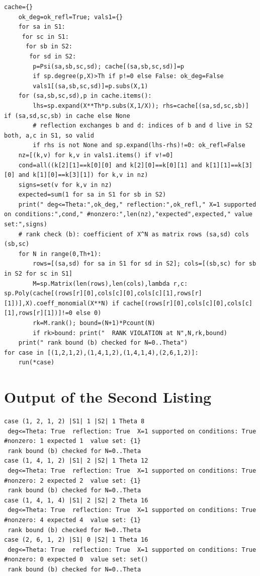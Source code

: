 \documentclass[11pt,letterpaper]{report}
\theoremstyle{plain}
\theoremstyle{definition}
\theoremstyle{remark}
\begin{document}
\begin{Verbatim}[fontsize=\scriptsize,breaklines=true,breakanywhere=true,frame=single]
    cache={}
    ok_deg=ok_refl=True; vals1={}
    for sa in S1:
     for sc in S1:
      for sb in S2:
       for sd in S2:
        p=Psi(sa,sb,sc,sd); cache[(sa,sb,sc,sd)]=p
        if sp.degree(p,X)>Th if p!=0 else False: ok_deg=False
        vals1[(sa,sb,sc,sd)]=p.subs(X,1)
    for (sa,sb,sc,sd),p in cache.items():
        lhs=sp.expand(X**Th*p.subs(X,1/X)); rhs=cache[(sa,sd,sc,sb)] if (sa,sd,sc,sb) in cache else None
        # reflection exchanges b and d: indices of b and d live in S2 both, a,c in S1, so valid
        if rhs is not None and sp.expand(lhs-rhs)!=0: ok_refl=False
    nz=[(k,v) for k,v in vals1.items() if v!=0]
    cond=all((k[2][1]==k[0][0] and k[2][0]==k[0][1] and k[1][1]==k[3][0] and k[1][0]==k[3][1]) for k,v in nz)
    signs=set(v for k,v in nz)
    expected=sum(1 for sa in S1 for sb in S2)
    print(" deg<=Theta:",ok_deg," reflection:",ok_refl," X=1 supported on conditions:",cond," #nonzero:",len(nz),"expected",expected," value set:",signs)
    # rank check (b): coefficient of X^N as matrix rows (sa,sd) cols (sb,sc)
    for N in range(0,Th+1):
        rows=[(sa,sd) for sa in S1 for sd in S2]; cols=[(sb,sc) for sb in S2 for sc in S1]
        M=sp.Matrix(len(rows),len(cols),lambda r,c: sp.Poly(cache[(rows[r][0],cols[c][0],cols[c][1],rows[r][1])],X).coeff_monomial(X**N) if cache[(rows[r][0],cols[c][0],cols[c][1],rows[r][1])]!=0 else 0)
        rk=M.rank(); bound=(N+1)*Pcount(N)
        if rk>bound: print("  RANK VIOLATION at N",N,rk,bound)
    print(" rank bound (b) checked for N=0..Theta")
for case in [(1,2,1,2),(1,4,1,2),(1,4,1,4),(2,6,1,2)]:
    run(*case)
\end{Verbatim}

\section{Output of the Second Listing}

\begin{Verbatim}[fontsize=\scriptsize,breaklines=true,breakanywhere=true,frame=single]
case (1, 2, 1, 2) |S1| 1 |S2| 1 Theta 8
 deg<=Theta: True  reflection: True  X=1 supported on conditions: True  #nonzero: 1 expected 1  value set: {1}
 rank bound (b) checked for N=0..Theta
case (1, 4, 1, 2) |S1| 2 |S2| 1 Theta 12
 deg<=Theta: True  reflection: True  X=1 supported on conditions: True  #nonzero: 2 expected 2  value set: {1}
 rank bound (b) checked for N=0..Theta
case (1, 4, 1, 4) |S1| 2 |S2| 2 Theta 16
 deg<=Theta: True  reflection: True  X=1 supported on conditions: True  #nonzero: 4 expected 4  value set: {1}
 rank bound (b) checked for N=0..Theta
case (2, 6, 1, 2) |S1| 0 |S2| 1 Theta 16
 deg<=Theta: True  reflection: True  X=1 supported on conditions: True  #nonzero: 0 expected 0  value set: set()
 rank bound (b) checked for N=0..Theta
\end{Verbatim}
\end{document}
